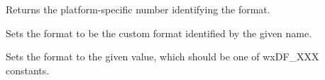 
Returns the platform-specific number identifying the format.

\label{wxdataformatsetid}


Sets the format to be the custom format identified by the given name.

\label{wxdataformatsettype}


Sets the format to the given value, which should be one of wxDF\_XXX constants.

